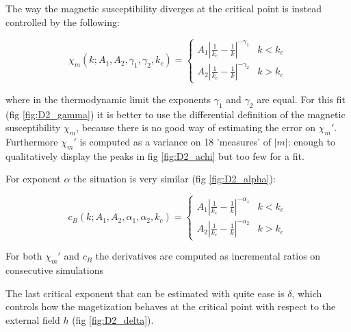 \documentclass[a4paper, 11pt]{article}
\begin{document}
    The way the magnetic susceptibility diverges at the critical point is instead controlled by the following:

    \begin{equation}
      \chi_m(k;A_1,A_2,\gamma_1,\gamma_2,k_c) = \begin{cases}
        A_1 \left|\frac{1}{k_c} - \frac{1}{k} \right|^{-\gamma_1} & k < k_c \\
        A_2 \left|\frac{1}{k_c} - \frac{1}{k} \right|^{-\gamma_2} & k > k_c
      \end{cases}
    \end{equation}

    where in the thermodynamic limit the exponents $\gamma_1$ and $\gamma_2$ are equal.
    For this fit (fig \ref{fig:D2_gamma}) it is better to use the differential definition of the magnetic susceptibility $\chi_m$, because there is no good way of estimating the error on $\chi_m'$. Furthermore $\chi_m'$ is computed as a variance on 18 'measures' of $|m|$: enough to qualitatively display the peaks in fig \ref{fig:D2_achi} but too few for a fit.


    For exponent $\alpha$ the situation is very similar (fig \ref{fig:D2_alpha}):

    \begin{equation}
      c_B(k;A_1,A_2,\alpha_1,\alpha_2,k_c) = \begin{cases}
        A_1 \left|\frac{1}{k_c} - \frac{1}{k} \right|^{-\alpha_1} & k < k_c \\
        A_2 \left|\frac{1}{k_c} - \frac{1}{k} \right|^{-\alpha_2} & k > k_c
      \end{cases}
    \end{equation}

    For both $\chi_m'$ and $c_B$ the derivatives are computed as incremental ratios on consecutive simulations

    The last critical exponent that can be estimated with quite ease is $\delta$, which controls how the magetization behaves at the critical point with respect to the external field $h$ (fig \ref{fig:D2_delta}).
\end{document}
